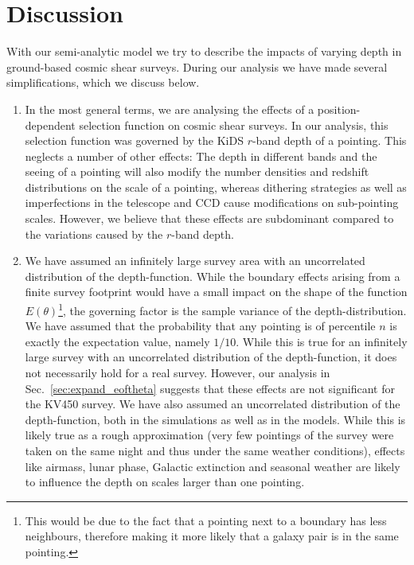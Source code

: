 \documentclass[referee]{aa} %
\renewcommand{\[}{\begin{equation}}
\renewcommand{\]}{\end{equation}}
\begin{document}
\section{Discussion}
\label{sec:discussion}
With our semi-analytic model we try to describe the impacts of varying depth in ground-based cosmic shear surveys. During our analysis we have made several simplifications, which we discuss below.
\begin{enumerate}
\item In the most general terms, we are analysing the effects of a position-dependent selection function on cosmic shear surveys. In our analysis, this selection function was governed by the KiDS $r$-band depth of a pointing. This neglects a number of other effects: The depth in different bands and the seeing of a pointing will also modify the number densities and redshift distributions on the scale of a pointing, whereas dithering strategies as well as imperfections in the telescope and CCD cause modifications on sub-pointing scales. However, we believe that these effects are subdominant compared to the variations caused by the $r$-band depth.

\item We have assumed an infinitely large survey area with an uncorrelated distribution of the depth-function. While the boundary effects arising from a finite survey footprint would have a small impact on the shape of the function $E(\theta)$\footnote{This would be due to the fact that a pointing next to a boundary has less neighbours, therefore making it more likely that a galaxy pair is in the same pointing.}, the governing factor is the sample variance of the depth-distribution. We have assumed that the probability that any pointing is of percentile $n$ is exactly the expectation value, namely $1/10$. While this is true for an infinitely large survey with an uncorrelated distribution of the depth-function, it does not necessarily hold for a real survey. However, our analysis in Sec.~\ref{sec:expand_eoftheta} suggests that these effects are not significant for the KV450 survey. We have also assumed an uncorrelated distribution of the depth-function, both in the simulations as well as in the models. While this is likely true as a rough approximation (very few pointings of the survey were taken on the same night and thus under the same weather conditions), effects like airmass, lunar phase, Galactic extinction and seasonal weather are likely to influence the depth on scales larger than one pointing.


\end{enumerate}
\end{document}

